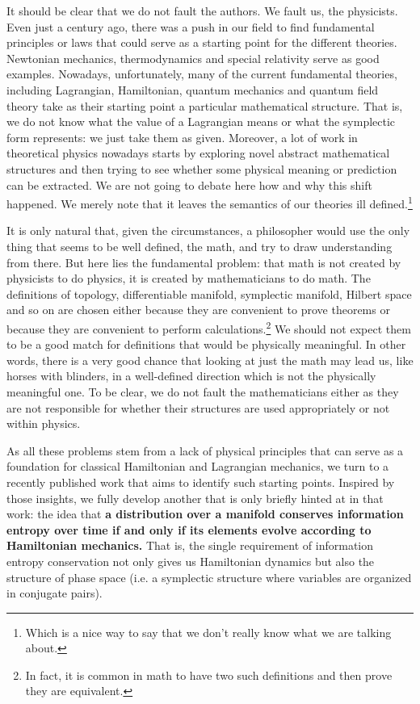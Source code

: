 \documentclass[11pt]{article}
\begin{document}
It should be clear that we do not fault the authors. We fault us, the physicists. Even just a century ago, there was a push in our field to find fundamental principles or laws that could serve as a starting point for the different theories. Newtonian mechanics, thermodynamics and special relativity serve as good examples. Nowadays, unfortunately, many of the current fundamental theories, including Lagrangian, Hamiltonian, quantum mechanics and quantum field theory take as their starting point a particular mathematical structure. That is, we do not know what the value of a Lagrangian means or what the symplectic form represents: we just take them as given. Moreover, a lot of work in theoretical physics nowadays starts by exploring novel abstract mathematical structures and then trying to see whether some physical meaning or prediction can be extracted. We are not going to debate here how and why this shift happened. We merely note that it leaves the semantics of our theories ill defined.\footnote{Which is a nice way to say that we don't really know what we are talking about.} 

It is only natural that, given the circumstances, a philosopher would use the only thing that seems to be well defined, the math, and try to draw understanding from there. But here lies the fundamental problem: that math is not created by physicists to do physics, it is created by mathematicians to do math. The definitions of topology, differentiable manifold, symplectic manifold, Hilbert space and so on are chosen either because they are convenient to prove theorems or because they are convenient to perform calculations.\footnote{In fact, it is common in math to have two such definitions and then prove they are equivalent.} We should not expect them to be a good match for definitions that would be physically meaningful. In other words, there is a very good chance that looking at just the math may lead us, like horses with blinders, in a well-defined direction which is not the physically meaningful one. To be clear, we do not fault the mathematicians either as they are not responsible for whether their structures are used appropriately or not within physics.

As all these problems stem from a lack of physical principles that can serve as a foundation for classical Hamiltonian and Lagrangian mechanics, we turn to a recently published work\cite{AoPPhy1} that aims to identify such starting points. Inspired by those insights, we fully develop another that is only briefly hinted at in that work: the idea that \textbf{a distribution over a manifold conserves information entropy over time if and only if its elements evolve according to Hamiltonian mechanics.} That is, the single requirement of information entropy conservation not only gives us Hamiltonian dynamics but also the structure of phase space (i.e. a symplectic structure where variables are organized in conjugate pairs).
\end{document}
